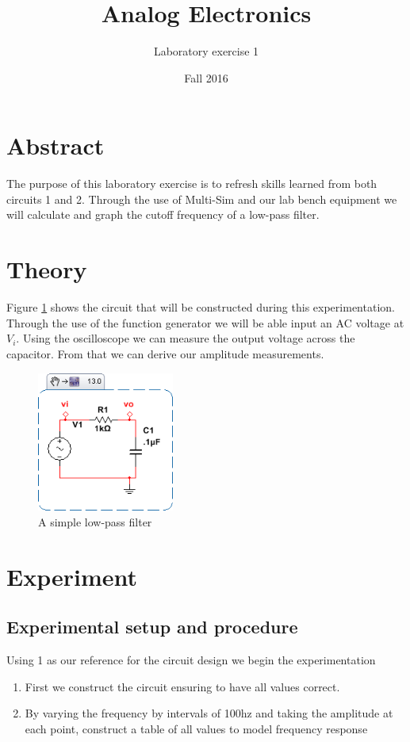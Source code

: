 \documentclass[12pt]{article}
\begin{document}
\title{Analog Electronics}
\author{Laboratory exercise 1}
\date{Fall 2016}
\maketitle

\newpage
\section{Abstract}

The purpose of this laboratory exercise is to refresh skills learned from both circuits 1 and 2. Through the use of Multi-Sim and our lab bench equipment we will calculate and graph the cutoff frequency of a low-pass filter.


\section{Theory}
\label{sec:desigan_and_analysis}

Figure \ref{fig:lab1_circuit} shows the circuit that will be constructed during this experimentation. Through the use of the function generator we will be able input an AC voltage at $V_i$. Using the oscilloscope we can measure the output voltage across the capacitor. From that we can derive our amplitude measurements. 

\begin{figure}[!h]
	\centering
	\includegraphics[width=0.4\textwidth]{lab1_circuit.png}
	\caption{A simple low-pass filter}
	\label{fig:lab1_circuit}
\end{figure}
\newpage

\section{Experiment}
\subsection{Experimental setup and procedure}
Using \figurename{1} as our reference for the circuit design we begin the experimentation
\begin{enumerate}
	\item First we construct the circuit ensuring to have all values correct.
	\item By varying the frequency by intervals of 100hz and taking the amplitude at each point, construct a table of all values to model frequency response
\end{enumerate}
\end{document}

